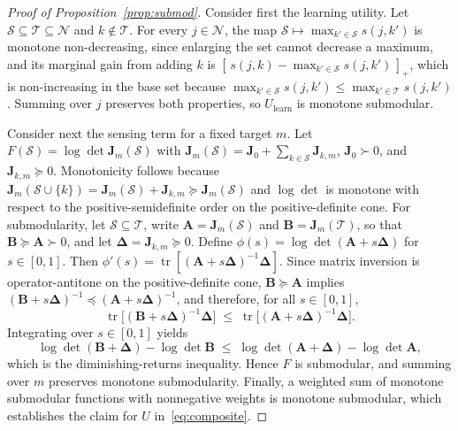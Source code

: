 \documentclass[lettersize,journal]{IEEEtran}
\newcommand{\bJ}{\bm{J}}
\newcommand{\calS}{\mathcal{S}}
\newcommand{\calT}{\mathcal{T}}
\newcommand{\calN}{\mathcal{N}}
\newcommand{\tr}{\operatorname{tr}}
\newcommand{\logdet}{\log\det}
\begin{document}
\begin{proof}[Proof of Proposition~\ref{prop:submod}]
Consider first the learning utility. Let $\calS\subseteq\calT\subseteq\calN$ and $k\notin\calT$. For every $j\in\calN$, the map $\calS\mapsto\max_{k'\in\calS}s(j,k')$ is monotone non-decreasing, since enlarging the set cannot decrease a maximum, and its marginal gain from adding $k$ is $[\,s(j,k)-\max_{k'\in\calS}s(j,k')\,]_+$, which is non-increasing in the base set because $\max_{k'\in\calS}s(j,k')\le\max_{k'\in\calT}s(j,k')$. Summing over $j$ preserves both properties, so $U_{\mathrm{learn}}$ is monotone submodular.

Consider next the sensing term for a fixed target $m$. Let $F(\calS)=\logdet\bJ_m(\calS)$ with $\bJ_m(\calS)=\bJ_0+\sum_{k\in\calS}\bJ_{k,m}$, $\bJ_0\succ 0$, and $\bJ_{k,m}\succeq 0$. Monotonicity follows because $\bJ_m(\calS\cup\{k\})=\bJ_m(\calS)+\bJ_{k,m}\succeq\bJ_m(\calS)$ and $\logdet$ is monotone with respect to the positive-semidefinite order on the positive-definite cone. For submodularity, let $\calS\subseteq\calT$, write $\bm{A}=\bJ_m(\calS)$ and $\bm{B}=\bJ_m(\calT)$, so that $\bm{B}\succeq\bm{A}\succ 0$, and let $\bm{\Delta}=\bJ_{k,m}\succeq 0$. Define $\phi(s)=\logdet(\bm{A}+s\bm{\Delta})$ for $s\in[0,1]$. Then $\phi'(s)=\tr[(\bm{A}+s\bm{\Delta})^{-1}\bm{\Delta}]$. Since matrix inversion is operator-antitone on the positive-definite cone, $\bm{B}\succeq\bm{A}$ implies $(\bm{B}+s\bm{\Delta})^{-1}\preceq(\bm{A}+s\bm{\Delta})^{-1}$, and therefore, for all $s\in[0,1]$,
\[
\tr\big[(\bm{B}+s\bm{\Delta})^{-1}\bm{\Delta}\big]\;\le\;\tr\big[(\bm{A}+s\bm{\Delta})^{-1}\bm{\Delta}\big].
\]
Integrating over $s\in[0,1]$ yields
\[
\logdet(\bm{B}+\bm{\Delta})-\logdet\bm{B}\;\le\;\logdet(\bm{A}+\bm{\Delta})-\logdet\bm{A},
\]
which is the diminishing-returns inequality. Hence $F$ is submodular, and summing over $m$ preserves monotone submodularity. Finally, a weighted sum of monotone submodular functions with nonnegative weights is monotone submodular, which establishes the claim for $U$ in~\eqref{eq:composite}.
\end{proof}
\end{document}
